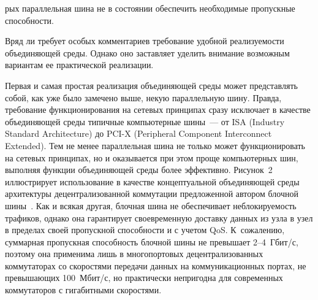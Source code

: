 \begin{multicols}{2}
\noindent
рых параллельная шина не в состоянии обеспечить необходимые пропускные 
способности.
     
     Вряд ли требует особых комментариев требование удобной реализуемости 
объединяющей среды. Однако оно заставляет уделить внимание возможным вариантам ее 
практической реализации.

    
Первая и самая простая реализация объединяющей среды может представлять собой, 
как уже было замечено выше, некую параллельную шину. Правда, требование 
функционирования на сетевых принципах сразу исключает в качестве объединяющей среды 
типичные компьютерные шины~--- от ISA (Industry Standard Architecture)
до PCI-X (Peripheral Component Interconnect Extended). Тем не менее параллельная шина не 
только может функционировать на сетевых принципах, но и оказывается при этом проще 
компьютерных шин, выполняя функции объединяющей среды более эффективно. 
Рисунок~2 иллюстрирует использование в качестве концептуальной объединяющей 
среды архитектуры децентрализованной коммутации предложенной автором блочной 
шины~\cite{5eg}. Как и всякая другая, блочная шина не обеспечивает неблокируемость 
трафиков, однако она гарантирует своевременную доставку данных из узла в узел в пределах 
своей пропускной способности и с учетом QoS. К~сожалению, суммарная пропускная 
способность блочной шины не превышает 2--4~Гбит/с, поэтому она применима лишь в 
многопортовых децентрализованных коммутаторах со скоростями передачи данных на 
коммуникационных портах, не превышающих 100~Мбит/с, но практически непригодна для 
современных коммутаторов с гигабитными скоростями.


\end{multicols}
